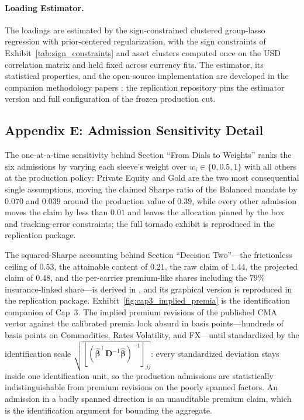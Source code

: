\documentclass[pdftex,12pt,a4paper]{article}
\begin{document}
\paragraph*{Loading Estimator.} The loadings are estimated by the sign-constrained clustered group-lasso regression with prior-centered regularization, with the sign constraints of Exhibit~\ref{tab:sign_constraints} and asset clusters computed once on the USD correlation matrix and held fixed across currency fits. The estimator, its statistical properties, and the open-source implementation are developed in the companion methodology papers \citep{SeppFactorLassoCSDA2026,SeppFactorLassoJSS2026}; the replication repository pins the estimator version and full configuration of the frozen production cut.

\subsection*{Appendix E: Admission Sensitivity Detail}\label{app:admission_detail}

The one-at-a-time sensitivity behind Section ``From Dials to Weights'' ranks the six admissions by varying each sleeve's weight over $w_i \in \{0, 0.5, 1\}$ with all others at the production policy: Private Equity and Gold are the two most consequential single assumptions, moving the claimed Sharpe ratio of the Balanced mandate by $0.070$ and $0.039$ around the production value of $0.39$, while every other admission moves the claim by less than $0.01$ and leaves the allocation pinned by the box and tracking-error constraints; the full tornado exhibit is reproduced in the replication package.

The squared-Sharpe accounting behind Section ``Decision Two''---the frictionless ceiling of $0.53$, the attainable content of $0.21$, the raw claim of $1.44$, the projected claim of $0.48$, and the per-carrier premium-like shares including the $79\%$ insurance-linked share---is derived in \citet{SeppKastenholzFAJ2026}, and its graphical version is reproduced in the replication package. Exhibit~\ref{fig:cap3_implied_premia} is the identification companion of Cap~3. The implied premium revisions of the published CMA vector against the calibrated premia look absurd in basis points---hundreds of basis points on Commodities, Rates Volatility, and FX---until standardized by the identification scale $\sqrt{[(\hat{\boldsymbol\beta}^{\intercal}\boldsymbol D^{-1}\hat{\boldsymbol\beta})^{-1}]_{jj}}$: every standardized deviation stays inside one identification unit, so the production admissions are statistically indistinguishable from premium revisions on the poorly spanned factors. An admission in a badly spanned direction is an unauditable premium claim, which is the identification argument for bounding the aggregate.
\end{document}
